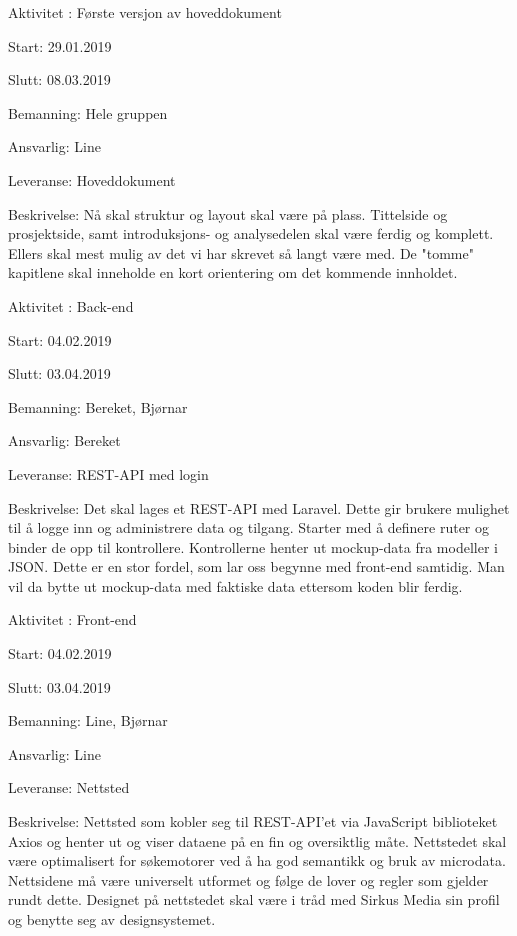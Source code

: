 \documentclass[11pt,a4paper]{report}
\begin{document}
\begin{compactdesc}
	\item [Aktivitet \arabic{aktivitetTeller}:] Første versjon av hoveddokument 
	\begin{compactitem}
	\item Start: 29.01.2019
	\item Slutt: 08.03.2019
	\item Bemanning: Hele gruppen
	\item Ansvarlig: Line
	\item Leveranse: Hoveddokument
	\item Beskrivelse: Nå skal struktur og layout skal være på plass. Tittelside og prosjektside, samt introduksjons- og analysedelen skal være ferdig og komplett. Ellers skal mest mulig av det vi har skrevet så langt være med. De "tomme" kapitlene skal inneholde en kort orientering om det kommende innholdet.
	\addtocounter{aktivitetTeller}{1}
	\end{compactitem}
	
	\item [Aktivitet \arabic{aktivitetTeller}:] Back-end
	\begin{compactitem}
	\item Start: 04.02.2019
	\item Slutt: 03.04.2019
	\item Bemanning: Bereket, Bjørnar
	\item Ansvarlig: Bereket
	\item Leveranse: REST-API med login
	\item Beskrivelse: Det skal lages et REST-API med Laravel. Dette gir brukere mulighet til å logge inn og administrere data og tilgang. Starter med å definere ruter og binder de opp til kontrollere. Kontrollerne henter ut mockup-data fra modeller i JSON. Dette er en stor fordel, som lar oss begynne med front-end samtidig. Man vil da bytte ut mockup-data med faktiske data ettersom koden blir ferdig.
	\addtocounter{aktivitetTeller}{1}
	\end{compactitem}
	
	\item [Aktivitet \arabic{aktivitetTeller}:] Front-end
	\begin{compactitem}
	\item Start: 04.02.2019
	\item Slutt: 03.04.2019
	\item Bemanning: Line, Bjørnar
	\item Ansvarlig: Line
	\item Leveranse: Nettsted
	\item Beskrivelse: Nettsted som kobler seg til REST-API'et via JavaScript biblioteket Axios og henter ut og viser dataene på en fin og oversiktlig måte. Nettstedet skal være optimalisert for søkemotorer ved å ha god semantikk og bruk av microdata. Nettsidene må være universelt utformet og følge de lover og regler som gjelder rundt dette. Designet på nettstedet skal være i tråd med Sirkus Media sin profil og benytte seg av designsystemet.
	\addtocounter{aktivitetTeller}{1}
	\end{compactitem}
	

\end{compactdesc}
\end{document}
